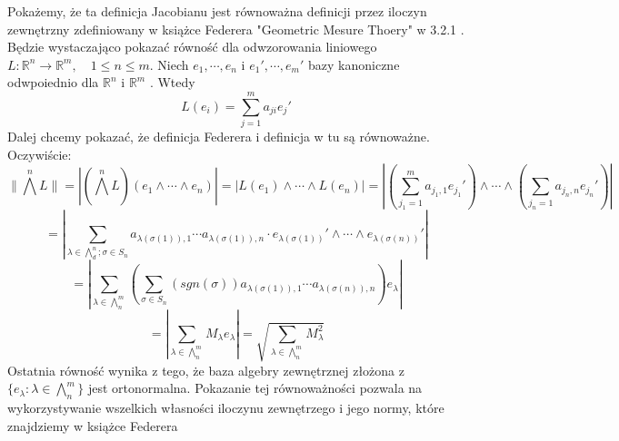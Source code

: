 \begin{lem}
	Pokażemy, że ta definicja Jacobianu jest równoważna definicji przez iloczyn zewnętrzny zdefiniowany w książce Federera "Geometric Mesure Thoery" w 3.2.1 \citep{Federer}. Będzie wystaczająco pokazać równość dla odwzorowania liniowego $L: \mathbb{R}^n \rightarrow \mathbb{R}^m, \quad 1 \leq n \leq m$. Niech $e_1, \cdots, e_n$ i $e_1', \cdots, e_m'$ bazy kanoniczne odwpoiednio dla $\mathbb{R}^n$ i $\mathbb{R}^m$ . Wtedy $$
		L(e_i) = \sum_{j=1}^m a_{ji} e_j'
	$$
	Dalej chcemy pokazać, że definicja Federera i definicja w tu są równoważne. Oczywiście:
	$$
		\| \bigwedge^n L \| = |(\bigwedge^n L) (e_1 \wedge \cdots \wedge e_n)| 
		= |L(e_1) \wedge \cdots \wedge L(e_n)| 
		= \left| (\sum^m_{j_1=1}a_{j_1, 1} e_{j_1}') \wedge \cdots \wedge (\sum_{j_n=1} a_{j_n, n} e_{j_n}') \right| 
	$$
	$$
		= \left| \sum_{\lambda \in \bigwedge^n_d; \sigma \in S_n} a_{\lambda(\sigma(1)), 1} \cdots a_{\lambda(\sigma(1)), n} 
			\cdot e_{\lambda(\sigma(1))}' \wedge \cdots \wedge e_{\lambda(\sigma(n))}'\right|
	$$
	$$
		= \left| \sum_{\lambda \in \bigwedge^m_n} \left( \sum_{\sigma \in S_n} (sgn(\sigma))a_{\lambda(\sigma(1)), 1} \cdots a_{\lambda(\sigma(n)), n} \right) e_{\lambda} \right|
	$$
	$$
		= \left| \sum_{\lambda \in \bigwedge_n^m} M_{\lambda} e_{\lambda} \right| = \sqrt{\sum_{\lambda \in \bigwedge_n^m} M_{\lambda}^2}
	$$
	Ostatnia równość wynika z tego, że baza algebry zewnętrznej złożona z $\{ e_{\lambda}: \lambda \in \bigwedge_n^m\}$ jest ortonormalna.\newline
	Pokazanie tej równoważności pozwala na wykorzystywanie wszelkich własności iloczynu zewnętrzego i jego normy, które znajdziemy w książce Federera \citep{Federer}
\end{lem}